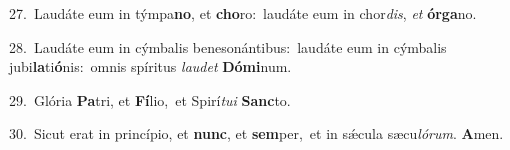 {\numbfont\textcolor{\numbcolor}{27.}}~Laudáte eum in týmpa\-\textbf{no}\-, et \textbf{cho}\-ro:~\star laudáte eum in chor\-\textit{dis}\-, \textit{et} \textbf{ór}\-\textbf{ga}no.\par
{\numbfont\textcolor{\numbcolor}{28.}}~Laudáte eum in cýmbalis benesonántibus:~\dagger laudáte eum in cýmbalis jubi\-\textbf{la}\-ti\-\textbf{ó}\-nis:~\star omnis spíritus \textit{lau}\-\textit{det} \textbf{Dó}\-\textbf{mi}num.\par
{\numbfont\textcolor{\numbcolor}{29.}}~Glória \textbf{Pa}\-tri, et \textbf{Fí}\-lio,~\star et Spirí\-\textit{tu}\-\textit{i} \textbf{Sanc}\-to.\par
{\numbfont\textcolor{\numbcolor}{30.}}~Sicut erat in princípio, et \textbf{nunc}\-, et \textbf{sem}\-per,~\star et in sǽcula sæcu\-\textit{ló}\-\textit{rum}. \textbf{A}\-men.\par
